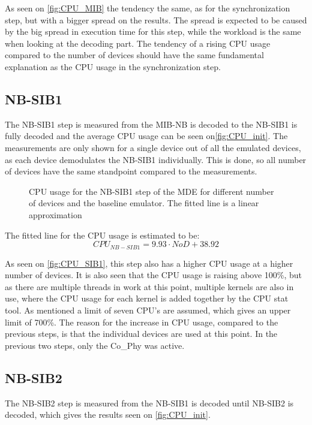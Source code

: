 As seen on \autoref{fig:CPU_MIB} the tendency the same, as for the synchronization step, but with a bigger spread on the results. The spread is expected to be caused by the big spread in execution time for this step, while the workload is the same when looking at the decoding part. The tendency of a rising CPU usage compared to the number of devices should have the same fundamental explanation as the CPU usage in the synchronization step.

\subsection{NB-SIB1}
The NB-SIB1 step is measured from the MIB-NB is decoded to the NB-SIB1 is fully decoded and the average CPU usage can be seen on\autoref{fig:CPU_init}. The measurements are only shown for a single device out of all the emulated devices, as each device demodulates the NB-SIB1 individually. This is done, so all number of devices have the same standpoint compared to the measurements.


\begin{figure}[H]
\centering
\resizebox{0.5\textwidth}{!}{
}
\caption{CPU usage for the NB-SIB1 step of the MDE for different number of devices and the baseline emulator. The fitted line is a linear approximation}
\label{fig:CPU_SIB1}
\end{figure}

The fitted line for the CPU usage is estimated to be:
\begin{equation}
CPU_{NB-SIB1} = 9.93 \cdot NoD + 38.92
\end{equation}

As seen on \autoref{fig:CPU_SIB1}, this step also has a higher CPU usage at a higher number of devices. It is also seen that the CPU usage is raising above 100\%, but as there are multiple threads in work at this point, multiple kernels are also in use, where the CPU usage for each kernel is added together by the CPU stat tool. As mentioned a limit of seven CPU's are assumed, which gives an upper limit of 700\%. The reason for the increase in CPU usage, compared to the previous steps, is that the individual devices are used at this point. In the previous two steps, only the Co\_Phy was active.

\subsection{NB-SIB2}
The NB-SIB2 step is measured from the NB-SIB1 is decoded until NB-SIB2 is decoded, which gives the results seen on \autoref{fig:CPU_init}. 

